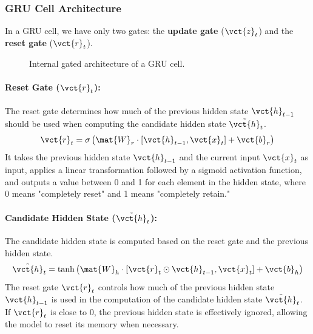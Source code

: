 \subsubsection{GRU Cell Architecture}
In a GRU cell, we have only two gates: the \textbf{update gate} ($\vct{z}_t$) and the \textbf{reset gate} ($\vct{r}_t$).

\begin{figure}[H]
    \centering
    \resizebox{.8\textwidth}{!}{
        
    }
    \caption{Internal gated architecture of a GRU cell.}
\end{figure}

\paragraph{Reset Gate ($\vct{r}_t$):}
The reset gate determines how much of the previous hidden state $\vct{h}_{t-1}$ should be used when computing the candidate hidden state $\tilde{\vct{h}}_t$.
\begin{equation}
    \vct{r}_t = \sigma\left(\mat{W}_r \cdot [\vct{h}_{t-1}, \vct{x}_t] + \vct{b}_r\right)
\end{equation}
It takes the previous hidden state $\vct{h}_{t-1}$ and the current input $\vct{x}_t$ as input, applies a linear transformation followed by a sigmoid activation function,
and outputs a value between 0 and 1 for each element in the hidden state, where 0 means "completely reset" and 1 means "completely retain."

\paragraph{Candidate Hidden State ($\tilde{\vct{h}}_t$):}
The candidate hidden state is computed based on the reset gate and the previous hidden state.
\begin{equation}
    \tilde{\vct{h}}_t = \tanh\left(\mat{W}_h \cdot [\vct{r}_t \odot \vct{h}_{t-1}, \vct{x}_t] + \vct{b}_h\right)
\end{equation}
The reset gate $\vct{r}_t$ controls how much of the previous hidden state $\vct{h}_{t-1}$ is used in the computation of the candidate hidden state $\tilde{\vct{h}}_t$.
If $\vct{r}_t$ is close to 0, the previous hidden state is effectively ignored, allowing the model to reset its memory when necessary.

